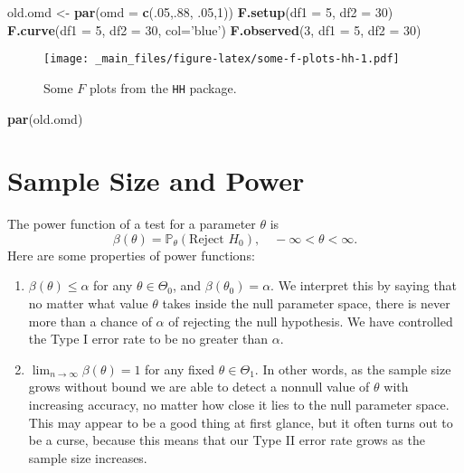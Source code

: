 \documentclass[]{book}
\newenvironment{Shaded}{\begin{snugshade}}{\end{snugshade}}
\newcommand{\KeywordTok}[1]{\textcolor[rgb]{0.13,0.29,0.53}{\textbf{{#1}}}}
\newcommand{\DataTypeTok}[1]{\textcolor[rgb]{0.13,0.29,0.53}{{#1}}}
\newcommand{\DecValTok}[1]{\textcolor[rgb]{0.00,0.00,0.81}{{#1}}}
\newcommand{\StringTok}[1]{\textcolor[rgb]{0.31,0.60,0.02}{{#1}}}
\newcommand{\NormalTok}[1]{{#1}}
\providecommand{\tightlist}{%
  \setlength{\itemsep}{0pt}\setlength{\parskip}{0pt}}
\numberwithin{equation}{chapter}
\numberwithin{figure}{chapter}
\theoremstyle{plain}
\theoremstyle{definition}
\theoremstyle{remark}
\theoremstyle{definition}
\theoremstyle{definition}
\theoremstyle{remark}
\begin{document}
\begin{Shaded}
\begin{Highlighting}[]
\NormalTok{old.omd <-}\StringTok{ }\KeywordTok{par}\NormalTok{(}\DataTypeTok{omd =} \KeywordTok{c}\NormalTok{(.}\DecValTok{05}\NormalTok{,.}\DecValTok{88}\NormalTok{, .}\DecValTok{05}\NormalTok{,}\DecValTok{1}\NormalTok{))}
\KeywordTok{F.setup}\NormalTok{(}\DataTypeTok{df1 =} \DecValTok{5}\NormalTok{, }\DataTypeTok{df2 =} \DecValTok{30}\NormalTok{)}
\KeywordTok{F.curve}\NormalTok{(}\DataTypeTok{df1 =} \DecValTok{5}\NormalTok{, }\DataTypeTok{df2 =} \DecValTok{30}\NormalTok{, }\DataTypeTok{col=}\StringTok{'blue'}\NormalTok{)}
\KeywordTok{F.observed}\NormalTok{(}\DecValTok{3}\NormalTok{, }\DataTypeTok{df1 =} \DecValTok{5}\NormalTok{, }\DataTypeTok{df2 =} \DecValTok{30}\NormalTok{)}
\end{Highlighting}
\end{Shaded}

\begin{figure}[htbp]
\centering
\texttt{[image: \_main\_files/figure-latex/some-f-plots-hh-1.pdf]}
\caption{\label{fig:some-f-plots-hh}\small Some \(F\) plots from the \texttt{HH}
package.}
\end{figure}

\begin{Shaded}
\begin{Highlighting}[]
\KeywordTok{par}\NormalTok{(old.omd)}
\end{Highlighting}
\end{Shaded}




\section{Sample Size and Power}\label{sec-sample-size-and-power}

The power function of a test for a parameter \(\theta\) is \[
\beta(\theta)=\mathbb{P}_{\theta}(\mbox{Reject }H_{0}),\quad -\infty < \theta < \infty.
\] Here are some properties of power functions:

\begin{enumerate}
\def\labelenumi{\arabic{enumi}.}
\tightlist
\item
  \(\beta(\theta)\leq\alpha\) for any \(\theta\in\Theta_{0}\), and
  \(\beta(\theta_{0})=\alpha\). We interpret this by saying that no
  matter what value \(\theta\) takes inside the null parameter space,
  there is never more than a chance of \(\alpha\) of rejecting the null
  hypothesis. We have controlled the Type I error rate to be no greater
  than \(\alpha\).
\item
  \(\lim_{n\to\infty}\beta(\theta)=1\) for any fixed
  \(\theta\in\Theta_{1}\). In other words, as the sample size grows
  without bound we are able to detect a nonnull value of \(\theta\) with
  increasing accuracy, no matter how close it lies to the null parameter
  space. This may appear to be a good thing at first glance, but it
  often turns out to be a curse, because this means that our Type II
  error rate grows as the sample size increases.
\end{enumerate}
\end{document}
